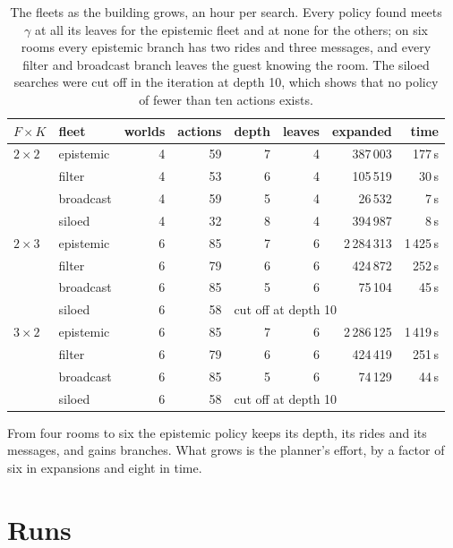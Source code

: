 \documentclass[11pt,a4paper]{article}
\theoremstyle{definition}
\begin{document}
\begin{table}[H]
\centering\small
\begin{tabular}{@{}l l r r r r r r@{}}
\toprule
$F \times K$ & fleet & worlds & actions & depth & leaves & expanded & time \\
\midrule
$2 \times 2$ & epistemic & 4 & 59 & 7 & 4 & 387\,003 & 177\,s \\
 & filter & 4 & 53 & 6 & 4 & 105\,519 & 30\,s \\
 & broadcast & 4 & 59 & 5 & 4 & 26\,532 & 7\,s \\
 & siloed & 4 & 32 & 8 & 4 & 394\,987 & 8\,s \\
$2 \times 3$ & epistemic & 6 & 85 & 7 & 6 & 2\,284\,313 & 1\,425\,s \\
 & filter & 6 & 79 & 6 & 6 & 424\,872 & 252\,s \\
 & broadcast & 6 & 85 & 5 & 6 & 75\,104 & 45\,s \\
 & siloed & 6 & 58 & \multicolumn{4}{l}{cut off at depth 10} \\
$3 \times 2$ & epistemic & 6 & 85 & 7 & 6 & 2\,286\,125 & 1\,419\,s \\
 & filter & 6 & 79 & 6 & 6 & 424\,419 & 251\,s \\
 & broadcast & 6 & 85 & 5 & 6 & 74\,129 & 44\,s \\
 & siloed & 6 & 58 & \multicolumn{4}{l}{cut off at depth 10} \\
\bottomrule
\end{tabular}
\caption{The fleets as the building grows, an hour per search. Every policy found
meets $\gamma$ at all its leaves for the epistemic fleet and at none for the
others; on six rooms every epistemic branch has two rides and three messages,
and every filter and broadcast branch leaves the guest knowing the room. The
siloed searches were cut off in the iteration at depth 10, which shows that no
policy of fewer than ten actions exists.}
\label{tab:scaling}
\end{table}

From four rooms to six the epistemic policy keeps its depth, its rides and its
messages, and gains branches. What grows is the planner's effort, by a factor of
six in expansions and eight in time.

\section{Runs}
\label{sec:runs}
\end{document}

